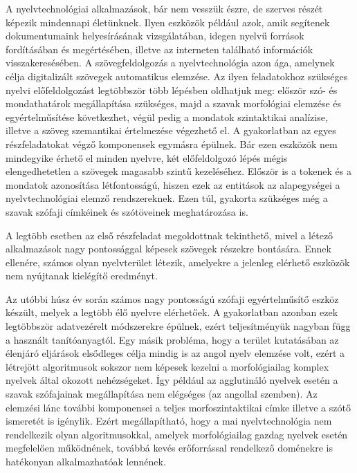 
A nyelvtechnológiai alkalmazások, bár nem vesszük észre, de szerves részét képezik mindennapi életünknek.
Ilyen eszközök például azok, amik segítenek dokumentumaink helyesírásának vizsgálatában, idegen nyelvű források fordításában és megértésében, illetve az interneten található információk visszakeresésében.
A szövegfeldolgozás a nyelvtechnológia azon ága, amelynek célja digitalizált szövegek automatikus elemzése.
Az ilyen feladatokhoz szükséges nyelvi előfeldolgozást legtöbbször több lépésben oldhatjuk meg: először szó- és mondathatárok megállapítása szükséges, majd a szavak morfológiai elemzése és egyértelműsítése következhet, végül pedig a mondatok szintaktikai analízise, illetve a szöveg szemantikai értelmezése végezhető el.
A gyakorlatban az egyes részfeladatokat végző komponensek egymásra épülnek.
Bár ezen eszközök nem mindegyike érhető el minden nyelvre, két előfeldolgozó lépés mégis elengedhetetlen a szövegek magasabb szintű kezeléséhez. 
Először is a tokenek és a mondatok azonosítása létfontosságú, hiszen ezek az entitások az alapegységei a nyelvtechnológiai elemző rendszereknek.
Ezen túl, gyakorta szükséges még a szavak szófaji címkéinek és szótöveinek meghatározása is.

A legtöbb esetben az első részfeladat megoldottnak tekinthető, mivel a létező alkalmazások nagy pontossággal képesek szövegek részekre bontására.
Ennek ellenére, számos olyan nyelvterület létezik, amelyekre a jelenleg elérhető eszközök nem nyújtanak kielégítő eredményt.

Az utóbbi húsz év során számos nagy pontosságú szófaji egyértelműsítő eszköz készült, melyek a legtöbb élő nyelvre elérhetőek.
A gyakorlatban azonban ezek legtöbbször adatvezérelt módszerekre épülnek, ezért teljesítményük nagyban függ a használt tanítóanyagtól.
Egy másik probléma, hogy a terület kutatásában az élenjáró eljárások elsődleges célja mindig is az angol nyelv elemzése volt, ezért a létrejött algoritmusok sokszor nem képesek kezelni a morfológiailag komplex nyelvek által okozott nehézségeket.
Így például az agglutináló nyelvek esetén a szavak szófajainak megállapítása nem elégséges (az angollal szemben).
Az elemzési lánc további komponensei a teljes morfoszintaktikai címke illetve a szótő ismeretét is igénylik.
Ezért megállapítható, hogy a mai nyelvtechnológia nem rendelkezik olyan algoritmusokkal, amelyek morfológiailag gazdag nyelvek esetén megfelelően működnének, továbbá kevés erőforrással rendelkező doménekre is hatékonyan alkalmazhatóak lennének.

